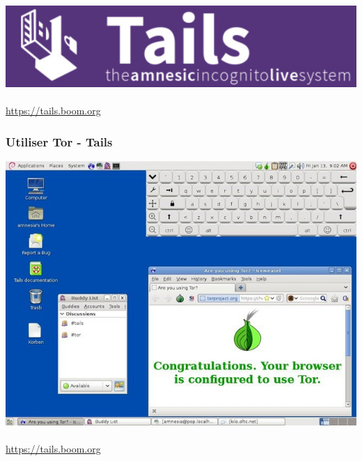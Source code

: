 \documentclass{beamer}
\begin{document}
\begin{frame}
\begin{center}
\includegraphics[scale=0.3]{./images/tails_logo.jpg}
\\~\\
\url{https://tails.boom.org}
\end{center}
\end{frame}
\begin{frame}
\frametitle{Utiliser Tor - Tails}
\begin{center}
\includegraphics[scale=0.3]{./images/tails.jpg}
\\~\\
\url{https://tails.boom.org}
\end{center}
\end{frame}
\end{document}
